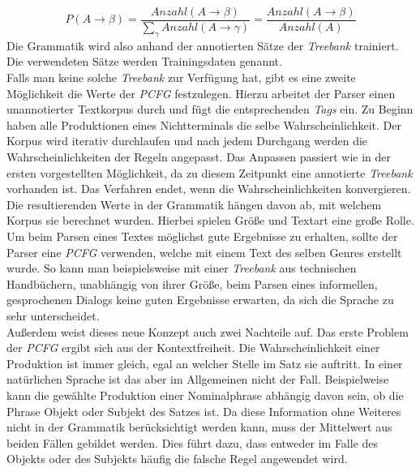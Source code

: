 \begin{equation}
P(A \to \beta) = \frac{Anzahl(A \to \beta)}{ \sum_{\gamma} Anzahl(A \to \gamma)} = \frac{Anzahl(A \to \beta)}{Anzahl(A)}
\end{equation}
Die Grammatik wird also anhand der annotierten Sätze der \textit{Treebank} trainiert. Die verwendeten Sätze werden Trainingsdaten genannt. \\
Falls man keine solche \textit{Treebank} zur Verfügung hat, gibt es eine zweite Möglichkeit die Werte der \textit{PCFG} festzulegen. Hierzu arbeitet der Parser einen unannotierter Textkorpus durch und fügt die entsprechenden \textit{Tags} ein. Zu Beginn haben alle Produktionen eines Nichtterminals die selbe Wahrscheinlichkeit. Der Korpus wird iterativ durchlaufen und nach jedem Durchgang werden die Wahrscheinlichkeiten der Regeln angepasst. Das Anpassen passiert wie in der ersten vorgestellten Möglichkeit, da zu diesem Zeitpunkt eine annotierte \textit{Treebank} vorhanden ist. Das Verfahren endet, wenn die Wahrscheinlichkeiten konvergieren. \\
Die resultierenden Werte in der Grammatik hängen davon ab, mit welchem Korpus sie berechnet wurden. Hierbei spielen Größe und Textart eine große Rolle. Um beim Parsen eines Textes möglichst gute Ergebnisse zu erhalten, sollte der Parser eine \textit{PCFG} verwenden, welche mit einem Text des selben Genres erstellt wurde. So kann man beispielsweise mit einer \textit{Treebank} aus technischen Handbüchern, unabhängig von ihrer Größe, beim Parsen eines informellen, gesprochenen Dialogs keine guten Ergebnisse erwarten, da sich die Sprache zu sehr unterscheidet.\\ %
Außerdem weist dieses neue Konzept auch zwei Nachteile auf.
Das erste Problem der \textit{PCFG} ergibt sich aus der Kontextfreiheit. Die Wahrscheinlichkeit einer Produktion ist immer gleich, egal an welcher Stelle im Satz sie auftritt. In einer natürlichen Sprache ist das aber im Allgemeinen nicht der Fall. Beispielweise kann die gewählte Produktion einer Nominalphrase abhängig davon sein, ob die Phrase Objekt oder Subjekt des Satzes ist. Da diese Information ohne Weiteres nicht in der Grammatik berücksichtigt werden kann, muss der Mittelwert aus beiden Fällen gebildet werden. Dies führt dazu, dass entweder im Falle des Objekts oder des Subjekts häufig die falsche Regel angewendet wird. \\
